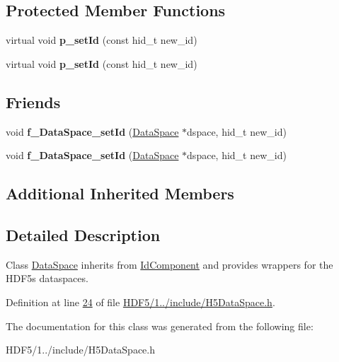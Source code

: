 \subsection*{Protected Member Functions}
\begin{DoxyCompactItemize}
\item 
\mbox{\label{class_h5_1_1_data_space_a2707d9faa53b9913f7a1ffafa7e289c3}} 
virtual void {\bfseries p\+\_\+set\+Id} (const hid\+\_\+t new\+\_\+id)
\item 
\mbox{\label{class_h5_1_1_data_space_a2707d9faa53b9913f7a1ffafa7e289c3}} 
virtual void {\bfseries p\+\_\+set\+Id} (const hid\+\_\+t new\+\_\+id)
\end{DoxyCompactItemize}
\subsection*{Friends}
\begin{DoxyCompactItemize}
\item 
\mbox{\label{class_h5_1_1_data_space_a0c67708838c1b3647849a9931ff2cee1}} 
void {\bfseries f\+\_\+\+Data\+Space\+\_\+set\+Id} (\hyperlink{class_h5_1_1_data_space}{Data\+Space} $\ast$dspace, hid\+\_\+t new\+\_\+id)
\item 
\mbox{\label{class_h5_1_1_data_space_a0c67708838c1b3647849a9931ff2cee1}} 
void {\bfseries f\+\_\+\+Data\+Space\+\_\+set\+Id} (\hyperlink{class_h5_1_1_data_space}{Data\+Space} $\ast$dspace, hid\+\_\+t new\+\_\+id)
\end{DoxyCompactItemize}
\subsection*{Additional Inherited Members}


\subsection{Detailed Description}
Class \hyperlink{class_h5_1_1_data_space}{Data\+Space} inherits from \hyperlink{class_h5_1_1_id_component}{Id\+Component} and provides wrappers for the H\+D\+F5\textquotesingle{}s dataspaces. 

Definition at line \hyperlink{_h_d_f5_21_810_81_2include_2_h5_data_space_8h_source_l00024}{24} of file \hyperlink{_h_d_f5_21_810_81_2include_2_h5_data_space_8h_source}{H\+D\+F5/1../include/\+H5\+Data\+Space.\+h}.



The documentation for this class was generated from the following file\+:\begin{DoxyCompactItemize}
\item 
H\+D\+F5/1../include/\+H5\+Data\+Space.\+h\end{DoxyCompactItemize}

